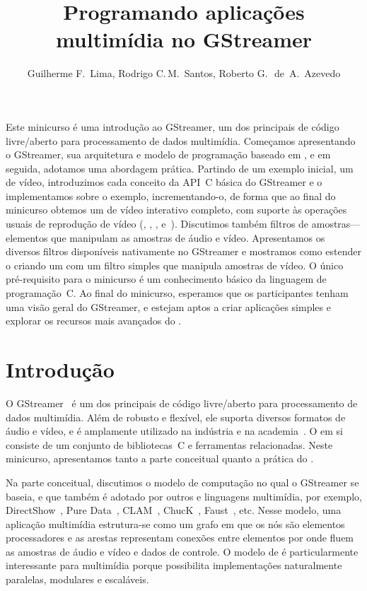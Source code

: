 \documentclass{SBCbookchapter}
\title{Programando aplicações multimídia no GStreamer}
\author{%
  Guilherme F\null.~Lima,
  Rodrigo C\null.\,M.~Santos,
  Roberto G\null.\,~de~A.~Azevedo
}
\begin{document}
\maketitle
{}\baselineskip\strut
\begin{abstract}
  
\end{abstract}
\begin{resumo}
  Este minicurso é uma introdução ao GStreamer, um dos principais
   de código livre/aberto para processamento de dados
  multimídia.  Começamos apresentando o GStreamer, sua arquitetura e modelo
  de programação baseado em , e em seguida, adotamos uma
  abordagem prática.  Partindo de um exemplo inicial, um  de
  vídeo, introduzimos cada conceito da API~C básica do GStreamer e o
  implementamos sobre o exemplo, incrementando-o, de forma que ao final do
  minicurso obtemos um  de vídeo interativo completo, com suporte
  às operações usuais de reprodução de vídeo (, ,
  ,  e~).  Discutimos também filtros de
  amostras---elementos que manipulam as amostras de áudio e vídeo.
  Apresentamos os diversos filtros disponíveis nativamente no GStreamer e
  mostramos como estender o  criando um  com um
  filtro simples que manipula amostras de vídeo.  O único pré-requisito para
  o minicurso é um conhecimento básico da linguagem de programação~C\null.
  Ao final do minicurso, esperamos que os participantes tenham uma visão
  geral do GStreamer, e estejam aptos a criar aplicações simples e explorar
  os recursos mais avançados do .
\end{resumo}


\section{Introdução}
\label{sec:intro}

O GStreamer~\cite{gstreamer} é um dos principais  de código
livre/aberto para processamento de dados multimídia.  Além de robusto e
flexível, ele suporta diversos formatos de áudio e vídeo, e é amplamente
utilizado na indústria e na academia~\cite{gstreamer-apps}.
O  em si consiste de um conjunto de bibliotecas~C e
ferramentas relacionadas.  Neste minicurso, apresentamos tanto a parte
conceitual quanto a prática do .

Na parte conceitual, discutimos o modelo de computação  no qual
o GStreamer se baseia, e que também é adotado por outros  e
linguagens multimídia, por exemplo, DirectShow~\cite{Chatterjee-A-1997},
Pure Data~\cite{Puckette-M-S-2007}, CLAM~\cite{Amatriain-X-2008},
ChucK~\cite{Wang-G-2003}, Faust~\cite{Orlarey-Y-2009}, etc.  Nesse modelo,
uma aplicação multimídia estrutura-se como um grafo em que os nós são
elementos processadores e as arestas representam conexões entre elementos
por onde fluem as amostras de áudio e vídeo e dados de controle.  O modelo
de  é particularmente interessante para multimídia porque
possibilita implementações naturalmente paralelas, modulares e escaláveis.
\end{document}
